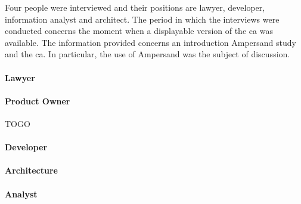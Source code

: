 Four people were interviewed and their positions are lawyer, developer, information analyst and architect.
The period in which the interviews were conducted concerns the moment when a displayable version of the \acrshort{ca} was available.
The information provided concerns an introduction Ampersand study and the \acrshort{ca}.
In particular, the use of Ampersand was the subject of discussion.


\paragraph{Lawyer}\label{par:interview-lawyer}


\paragraph{Product Owner}
TOGO

\paragraph{Developer}\label{par:interview-developer}


\paragraph{Architecture}\label{par:interview-architecture}


\paragraph{Analyst}\label{par:interview-analist}



